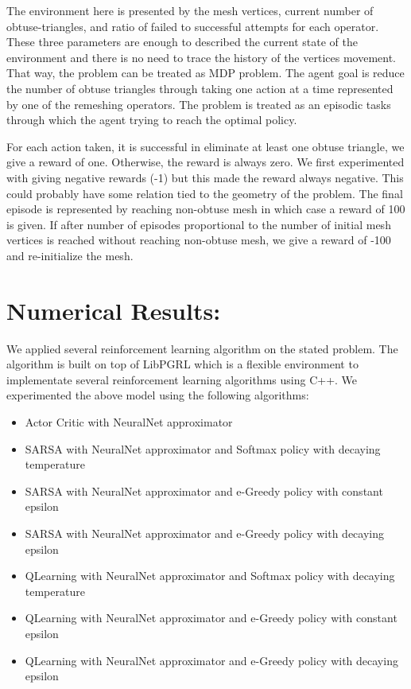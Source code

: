 \documentclass[a4paper,10pt]{article}
\begin{document}
The environment here is presented by the mesh vertices, current number of obtuse-triangles, and ratio of failed to successful attempts for each operator. These three parameters are enough to  described the current state of the environment and there is no need to trace the history of the vertices movement. That way, the problem can be treated as MDP problem. The agent goal is reduce the number of obtuse triangles through taking one action at a time represented by one of the remeshing operators. The problem is treated as an episodic tasks through which the agent trying to reach the optimal policy. 

For each action taken, it is successful in eliminate at least one obtuse triangle, we give a reward of one. Otherwise, the reward is always zero. We first experimented with giving negative rewards (-1) but this made the reward always negative. This could probably have some relation tied to the geometry of the problem. The final episode is represented by reaching non-obtuse mesh in which case a reward of 100 is given. If after number of episodes proportional to the number of initial mesh vertices is reached without reaching non-obtuse mesh, we give a reward of -100 and re-initialize the mesh. 


\section{Numerical Results:}
We applied several reinforcement learning algorithm on the stated problem. The algorithm is built on top of LibPGRL \citep{libpgrl} which is a flexible environment to implementate several reinforcement learning algorithms using C++. We experimented the above model using the following algorithms:
\begin{itemize}
\item Actor Critic with NeuralNet approximator
\item SARSA with NeuralNet approximator and Softmax policy with decaying temperature
\item SARSA with NeuralNet approximator and e-Greedy policy with constant epsilon
\item SARSA with NeuralNet approximator and e-Greedy policy with decaying epsilon
\item QLearning with NeuralNet approximator and Softmax policy with decaying temperature
\item QLearning with NeuralNet approximator and e-Greedy policy with constant epsilon
\item QLearning with NeuralNet approximator and e-Greedy policy with decaying epsilon
\end{itemize}
\end{document}
